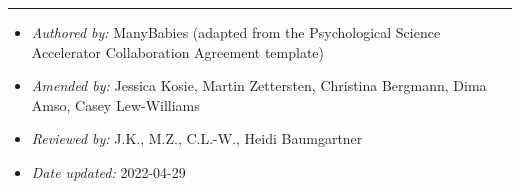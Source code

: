 \documentclass[
  letterpaper,
  DIV=11,
  numbers=noendperiod,
  oneside]{scrreprt}
\providecommand{\tightlist}{%
  \setlength{\itemsep}{0pt}\setlength{\parskip}{0pt}}
\begin{document}
\begin{center}\rule{0.5\linewidth}{0.5pt}\end{center}

\begin{itemize}
\tightlist
\item
  \emph{Authored by:} ManyBabies (adapted from the Psychological Science
  Accelerator Collaboration Agreement template)
\item
  \emph{Amended by:} Jessica Kosie, Martin Zettersten, Christina
  Bergmann, Dima Amso, Casey Lew-Williams
\item
  \emph{Reviewed by:} J.K., M.Z., C.L.-W., Heidi Baumgartner
\item
  \emph{Date updated:} 2022-04-29
\end{itemize}
\end{document}
